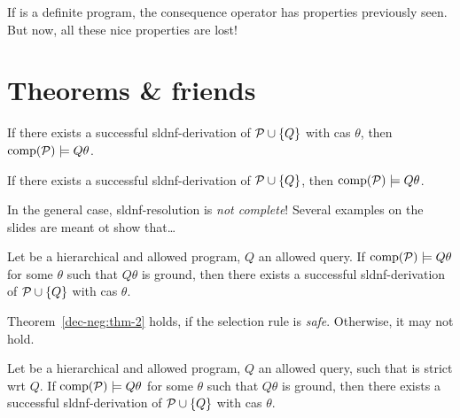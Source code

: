 \begin{rem}
    If \prog is a definite program, the consequence operator has properties previously seen.
    But now, all these nice properties are lost!
\end{rem}

\section{Theorems \& friends}

\begin{thm}
    \label{dec-neg:thm-1}
    If there exists a successful \gls{sldnf}-derivation of \(\mathcal{P} \cup \lbrace Q \rbrace\) with \gls{cas} \(\theta\), then \(\operatorname{comp}(\mathcal{P}) \models Q\theta\).
\end{thm}

\begin{cor}
    If there exists a successful \gls{sldnf}-derivation of \(\mathcal{P} \cup \lbrace Q \rbrace\), then \(\operatorname{comp}(\mathcal{P}) \models Q\theta\).
\end{cor}

\begin{rem}
    In the general case, \gls{sldnf}-resolution is \emph{not complete}!
    Several examples on the slides are meant ot show that\ldots
\end{rem}

\begin{thm}
    \label{dec-neg:thm-2}
    Let \prog be a hierarchical and allowed program, \(Q\) an allowed query.
    If \(\operatorname{comp}(\mathcal{P}) \models Q\theta\) for some \(\theta\) such that \(Q\theta\) is ground, then there exists  a successful \gls{sldnf}-derivation of \(\mathcal{P} \cup \lbrace Q \rbrace\) with \gls{cas} \(\theta\).
\end{thm}

\begin{rem}
    Theorem~\ref{dec-neg:thm-2} holds, if the selection rule is \emph{safe}. Otherwise, it may not hold.
\end{rem}

\begin{thm}
    \label{de-neg:thm-3}
    Let \prog be a hierarchical and allowed program, \(Q\) an allowed query, such that \prog is strict wrt \(Q\).
    If \(\operatorname{comp}(\mathcal{P}) \models Q\theta\) for some \(\theta\) such that \(Q\theta\) is ground, then there exists  a successful \gls{sldnf}-derivation of \(\mathcal{P} \cup \lbrace Q \rbrace\) with \gls{cas} \(\theta\).
\end{thm}

